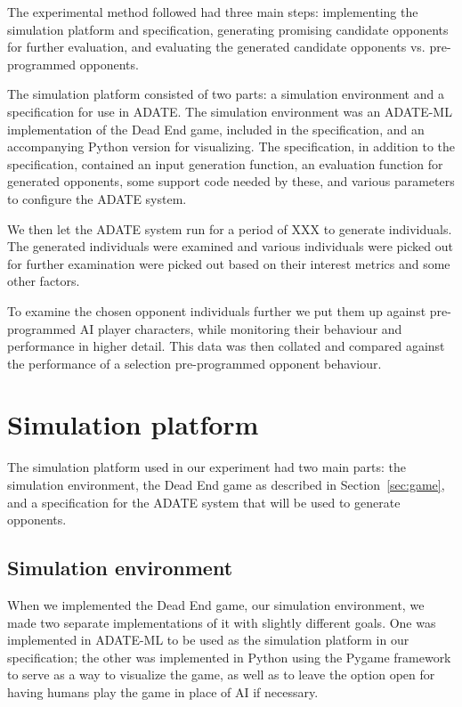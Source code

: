  The experimental
method followed had three main steps: implementing the simulation platform and
specification, generating promising candidate opponents for further evaluation,
and evaluating the generated candidate opponents vs. pre-programmed opponents.

The simulation platform consisted of two parts: a simulation environment and a
specification for use in ADATE. The simulation environment was an ADATE-ML
implementation of the Dead End game, included in the specification, and an
accompanying Python version for visualizing. The specification, in addition to
the specification, contained an input generation function, an evaluation
function for generated opponents, some support code needed by these, and various
parameters to configure the ADATE system.

We then let the ADATE system run for a period of XXX
to generate individuals. The generated individuals were examined and various
individuals were picked out for further examination were picked out based on
their interest metrics and some other factors.

To examine the chosen opponent individuals further we put them up against pre-
programmed AI player characters, while monitoring their behaviour and
performance in higher detail. This data was then collated and compared against
the performance of a selection pre-programmed opponent behaviour.

\section{Simulation platform}
\label{sec:sim-platform}

The simulation platform used in our experiment had two main parts: the
simulation environment, the Dead End game as described in
Section~\ref{sec:game}, and a specification for the ADATE system that will be
used to generate opponents.

\subsection{Simulation environment}
\label{sec:sim-environment}

When we implemented the Dead End game, our simulation environment, we made two
separate implementations of it with slightly different goals. One was
implemented in ADATE-ML to be used as the simulation platform in our
specification; the other was implemented in Python using the Pygame framework
\citep{pygame} to serve as a way to visualize the game, as well as to leave the
option open for having humans play the game in place of AI if necessary.

